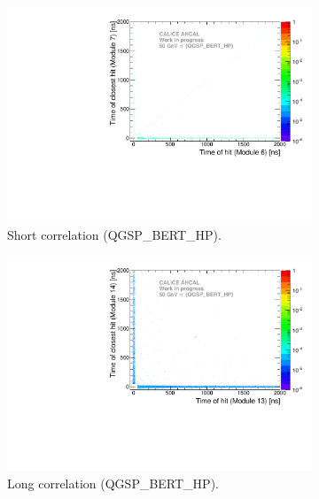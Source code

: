 \begin{figure}[htbp!]
	\begin{subfigure}[t]{0.5\textwidth}
		\centering
		\includegraphics[width=1\textwidth]{../Thesis_Plots/Timing/Pions/Plots/ComparisonToSim/Time_Correlation_50GeV_short_QGSPBERTHP.pdf}
		\caption{Short correlation (QGSP\_BERT\_HP).} \label{fig:Corr_short_QGSPBERTHP}
	\end{subfigure}
	\hfill
	\begin{subfigure}[t]{0.5\textwidth}
		\centering
		\includegraphics[width=1\textwidth]{../Thesis_Plots/Timing/Pions/Plots/ComparisonToSim/Time_Correlation_50GeV_long_QGSPBERTHP.pdf}
		\caption{Long correlation (QGSP\_BERT\_HP).} \label{fig:Corr_long_QGSPBERTHP}
	\end{subfigure}
	\hfill
	\begin{subfigure}[t]{0.5\textwidth}

\end{subfigure}
\end{figure}
